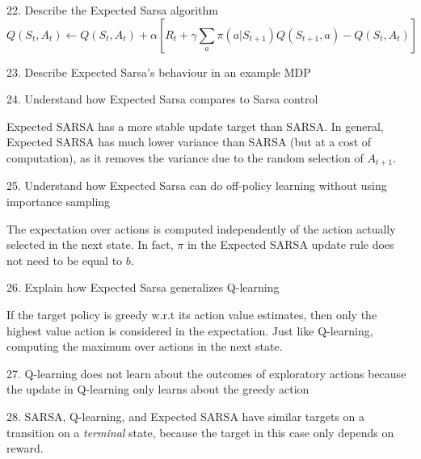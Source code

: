 \documentclass[sutton_barto_notes.tex]{subfiles}
\begin{document}
22. Describe the Expected Sarsa algorithm
$$Q(S_t, A_t)\leftarrow Q(S_t, A_t) + \alpha [R_t + \gamma \sum_a \pi(a|S_{t+1})Q(S_{t+1},a) - Q(S_t, A_t)]$$

23. Describe Expected Sarsa’s behaviour in an example MDP

24. Understand how Expected Sarsa compares to Sarsa control

Expected SARSA has a more stable update target than SARSA. In general, Expected SARSA has much lower variance than SARSA (but at a cost of computation), as it removes the variance due to the random selection of $A_{t+1}$.

25. Understand how Expected Sarsa can do off-policy learning without using importance sampling

The expectation over actions is computed independently of the action actually selected in the next state. In fact, $\pi$ in the Expected SARSA update rule does not need to be equal to $b$.

26. Explain how Expected Sarsa generalizes Q-learning

If the target policy is greedy w.r.t its action value estimates, then only the highest value action is considered in the expectation. Just like Q-learning, computing the maximum over actions in the next state.

27. Q-learning does not learn about the outcomes of exploratory actions because the update in Q-learning only learns about the greedy action

28. SARSA, Q-learning, and Expected SARSA have similar targets on a transition on a \textit{terminal} state, because the target in this case only depends on reward.
\end{document}

